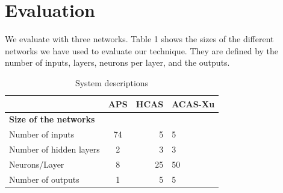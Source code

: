 \chapter{Evaluation}
\label{evaluation}
We evaluate \tool with three networks. 
Table 1 shows the sizes of the different networks we have used to evaluate our technique. They are defined by the number of inputs, layers, neurons per layer, and the outputs. 


\begin{table}[h!]
	\begin{center}
		\caption{System descriptions}
		\label{tab:table1}
		\begin{tabular}{l|S|r|l}
			\textbf{} & \textbf{APS} & \textbf{HCAS} & \textbf{ACAS-Xu} \\
			\hline
			\textbf{Size of the networks} &  &  &  \\
			Number of inputs &  74&   5&  5\\
			Number of hidden layers &  2&  3&  3\\
			Neurons/Layer &  8&  25 & 50 \\
			Number of outputs & 1&  5& 5\\
			\hline
			\hline
			
		\end{tabular}
	\end{center}
\end{table}


